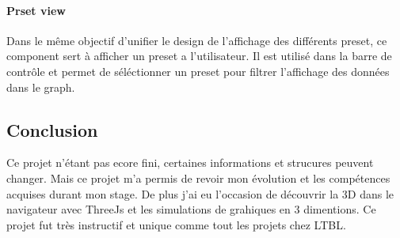 \paragraph{Prset view} Dans le même objectif d'unifier le design de l'affichage des différents preset, ce component sert à afficher un preset a l'utilisateur.
Il est utilisé dans la barre de contrôle et permet de séléctionner un preset pour filtrer l'affichage des données dans le graph.

\subsection{Conclusion}
\label{biomerieuxBiopediaConclusion}

Ce projet n'étant pas ecore fini, certaines informations et strucures peuvent changer.
Mais ce projet m'a permis de revoir mon évolution et les compétences acquises durant mon stage.
De plus j'ai eu l'occasion de découvrir la 3D dans le navigateur avec ThreeJs et les simulations de grahiques en 3 dimentions.
Ce projet fut très instructif et unique comme tout les projets chez LTBL.